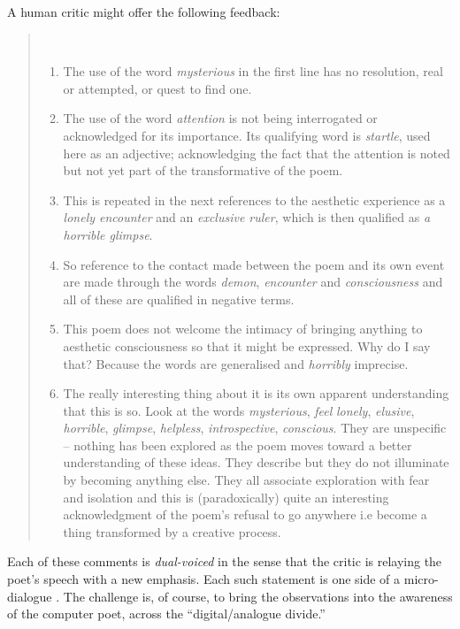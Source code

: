 A human critic might offer the following feedback:

\begin{quotation}
~\vspace{-1\baselineskip}
\begin{enumerate}
\item The use of the word \emph{mysterious} in the first line has no
  resolution, real or attempted, or quest to find one.
%
\item The use of the word \emph{attention} is not being interrogated
  or acknowledged for its importance.  Its qualifying word is
  \emph{startle}, used here as an adjective; acknowledging the fact
  that the attention is noted but not yet part of the transformative
  of the poem.
%
\item This is repeated in the next references to the aesthetic
  experience as a \emph{lonely encounter} and an \emph{exclusive
    ruler}, which is then qualified as \emph{a horrible glimpse}.
%
\item So reference to the contact made between the poem and its own
  event are made through the words \emph{demon}, \emph{encounter} and
  \emph{consciousness} and all of these are qualified in negative
  terms.
%
\item This poem does not welcome the intimacy of bringing anything to
  aesthetic consciousness so that it might be expressed. Why do I say
  that? Because the words are generalised and \emph{horribly}
  imprecise.
%
\item The really interesting thing about it is its own apparent
  understanding that this is so.  Look at the words \emph{mysterious},
  \emph{feel} \emph{lonely}, \emph{elusive}, \emph{horrible},
  \emph{glimpse}, \emph{helpless}, \emph{introspective},
  \emph{conscious}. They are unspecific -- nothing has been explored
  as the poem moves toward a better understanding of these ideas. They
  describe but they do not illuminate by becoming anything else. They
  all associate exploration with fear and isolation and this is
  (paradoxically) quite an interesting acknowledgment of the poem’s
  refusal to go anywhere i.e become a thing transformed by a creative
  process.
\end{enumerate}
\end{quotation}

Each of these comments is \emph{dual-voiced} in the sense that the
critic is relaying the poet's speech with a new emphasis.  Each such
statement is one side of a micro-dialogue
\cite[p. 73]{bakhtin1984problems}.  The challenge is, of course, to
bring the observations into the awareness of the computer poet, across
the ``digital/analogue divide.''

